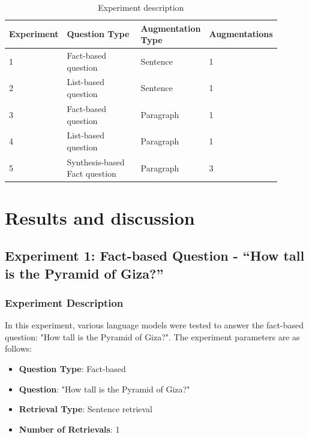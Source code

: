 \documentclass{wseas}
\begin{document}
\begin{table}[htbp]
  \caption{Experiment description} 
  \label{tab:experiment_questions_table}
    \centering
      \begin{tabular} {|p{0.15\linewidth}|p{0.35\linewidth}|p{0.25\linewidth}|p{0.15\linewidth}|}
        \hline
        \textbf{Experiment} & \textbf{Question Type} & \textbf{Augmentation Type} & \textbf{Augmentations} \\ \hline
        1 & Fact-based question & Sentence & 1 \\ \hline
        2 & List-based question & Sentence & 1 \\ \hline
        3 & Fact-based question & Paragraph & 1 \\ \hline
        4 & List-based question & Paragraph & 1 \\ \hline
        5 & Synthesis-based Fact question & Paragraph & 3 \\ \hline
      \end{tabular}
\end{table}

    

\section{Results and discussion}

\subsection{Experiment 1: Fact-based Question - ``How tall is the
Pyramid of
Giza?''}

\subsubsection{Experiment Description}
In this experiment, various language models were tested to answer the
fact-based question: "How tall is the Pyramid of Giza?". The
experiment parameters are as follows:

\begin{itemize}
  \item
    \textbf{Question Type}: Fact-based
  \item
    \textbf{Question}: "How tall is the Pyramid of Giza?"
  \item
    \textbf{Retrieval Type}: Sentence retrieval
  \item
    \textbf{Number of Retrievals}: 1
\end{itemize}
\end{document}
